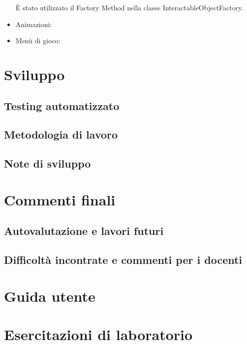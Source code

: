\documentclass[a4paper,12pt]{report}
\begin{document}
\begin{itemize}
	È stato utilizzato il Factory Method nella classe InteractableObjectFactory.
	\item Animazioni:
	\item Menù di gioco:
\end{itemize}




\chapter{Sviluppo}

\section{Testing automatizzato}

\section{Metodologia di lavoro}



\section{Note di sviluppo}



\chapter{Commenti finali}



\section{Autovalutazione e lavori futuri}



\section{Difficoltà incontrate e commenti per i docenti}



\appendix
\chapter{Guida utente}


\chapter{Esercitazioni di laboratorio}





\end{document}
